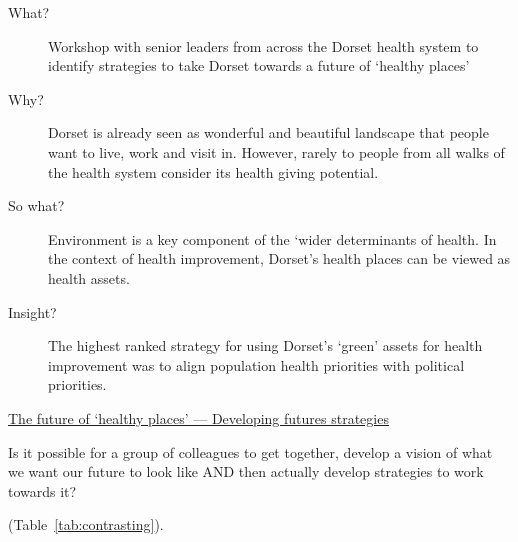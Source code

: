 \begin{description}
	\item[What?] Workshop with senior leaders from across the Dorset health system to identify strategies to take Dorset towards a future of ‘healthy places’
	\item[Why?] Dorset is already seen as wonderful and beautiful landscape that people want to live, work and visit in. However, rarely to people from all walks of the health system consider its health giving potential.
	\item[So what?] Environment is a key component of the ‘wider determinants of health. In the context of health improvement, Dorset’s health places can be viewed as health assets.
	\item[Insight?] The highest ranked strategy for using Dorset’s ‘green’ assets for health improvement was to align population health priorities with political priorities.
\end{description}

\href{https://www.publichealthdorset.org.uk/blogs/the-future-of-healthy-places-developing-futures-strategies.aspx}{The future of ‘healthy places’ — Developing futures strategies}

Is it possible for a group of colleagues to get together, develop a vision of what we want our future to look like AND then actually develop strategies to work towards it?

(Table~\ref{tab:contrasting}).

